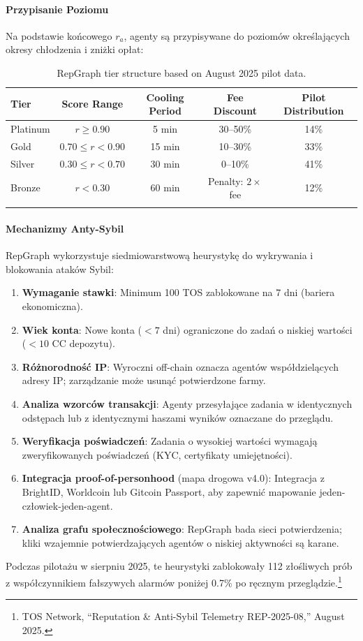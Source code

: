 \documentclass[11pt]{article}
\begin{document}
\paragraph{Przypisanie Poziomu} Na podstawie końcowego $r_a$, agenty są przypisywane do poziomów określających okresy chłodzenia i zniżki opłat:
\begin{longtable}{@{}lcccc@{}}
\toprule
\textbf{Tier} & \textbf{Score Range} & \textbf{Cooling Period} & \textbf{Fee Discount} & \textbf{Pilot Distribution} \\\midrule
Platinum & $r \geq 0.90$ & 5 min & 30--50\% & 14\% \\
Gold & $0.70 \leq r < 0.90$ & 15 min & 10--30\% & 33\% \\
Silver & $0.30 \leq r < 0.70$ & 30 min & 0--10\% & 41\% \\
Bronze & $r < 0.30$ & 60 min & Penalty: $2 \times$ fee & 12\% \\\bottomrule
\caption{RepGraph tier structure based on August 2025 pilot data.}
\label{tab:reputation-tiers}
\end{longtable}

\paragraph{Mechanizmy Anty-Sybil} RepGraph wykorzystuje siedmiowarstwową heurystykę do wykrywania i blokowania ataków Sybil:
\begin{enumerate}[noitemsep]
  \item \textbf{Wymaganie stawki}: Minimum 100 TOS zablokowane na 7 dni (bariera ekonomiczna).
  \item \textbf{Wiek konta}: Nowe konta ($<7$ dni) ograniczone do zadań o niskiej wartości ($<10$ CC depozytu).
  \item \textbf{Różnorodność IP}: Wyroczni off-chain oznacza agentów współdzielących adresy IP; zarządzanie może usunąć potwierdzone farmy.
  \item \textbf{Analiza wzorców transakcji}: Agenty przesyłające zadania w identycznych odstępach lub z identycznymi haszami wyników oznaczane do przeglądu.
  \item \textbf{Weryfikacja poświadczeń}: Zadania o wysokiej wartości wymagają zweryfikowanych poświadczeń (KYC, certyfikaty umiejętności).
  \item \textbf{Integracja proof-of-personhood} (mapa drogowa v4.0): Integracja z BrightID, Worldcoin lub Gitcoin Passport, aby zapewnić mapowanie jeden-człowiek-jeden-agent.
  \item \textbf{Analiza grafu społecznościowego}: RepGraph bada sieci potwierdzenia; kliki wzajemnie potwierdzających agentów o niskiej aktywności są karane.
\end{enumerate}
Podczas pilotażu w sierpniu 2025, te heurystyki zablokowały 112 złośliwych prób z współczynnikiem fałszywych alarmów poniżej 0.7\% po ręcznym przeglądzie.\footnote{TOS Network, ``Reputation \& Anti-Sybil Telemetry REP-2025-08,'' August 2025.}
\end{document}
